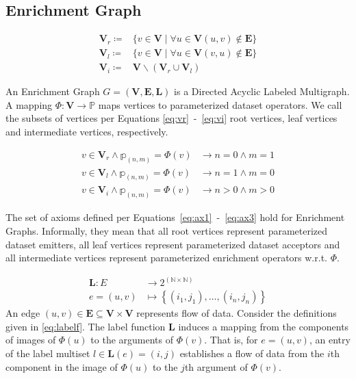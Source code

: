 \subsection{Enrichment Graph}
\label{ssec:enrichmentgraph}

\begin{align}
  \mathbf{V}_r \coloneq & \{v \in \mathbf{V} \mid \forall u \in \mathbf{V} (u, v) \notin \mathbf{E}\} \label{eq:vr} \\
  \mathbf{V}_l \coloneq & \{v \in \mathbf{V} \mid \forall u \in \mathbf{V} (v, u) \notin \mathbf{E}\} \label{eq:vl} \\
  \mathbf{V}_i \coloneq & \mathbf{V}
  \backslash (\mathbf{V}_r \cup \mathbf{V}_l) \label{eq:vi}
\end{align}

An Enrichment Graph $G=(\mathbf{V},\mathbf{E},\mathbf{L})$ is a Directed Acyclic Labeled Multigraph.
A mapping $\Phi\colon \mathbf{V} \to \mathbb{P}$ maps vertices to parameterized dataset operators.
We call the subsets of vertices per Equations \ref{eq:vr}~-~\ref{eq:vi} root vertices, leaf vertices and intermediate vertices, respectively.

\begin{align}
v \in \mathbf{V}_r \land \mathbb{p}_{(n,m)} = \Phi(v) & \to n = 0 \land m = 1 \label{eq:ax1} \\
v \in \mathbf{V}_l \land \mathbb{p}_{(n,m)} = \Phi(v) & \to n = 1 \land m = 0 \label{eq:ax2} \\
v \in \mathbf{V}_i \land \mathbb{p}_{(n,m)} = \Phi(v) & \to n > 0 \land m > 0 \label{eq:ax3}
\end{align}

The set of axioms defined per Equations~\ref{eq:ax1}~-~\ref{eq:ax3} hold for Enrichment Graphs.
Informally, they mean that all root vertices represent parameterized dataset emitters, all leaf vertices represent parameterized dataset acceptors and all intermediate vertices represent parameterized enrichment operators w.r.t. $\Phi$.

\begin{equation}
\begin{aligned}
  \mathbf{L}\colon E & \to 2^{(\mathbb{N} \times \mathbb{N})} \\
  e = (u,v) & \mapsto \left\{ (i_1, j_1), \dots, (i_n, j_n) \right\}
\end{aligned}
\label{eq:labelf}
\end{equation}
An edge $(u, v) \in \mathbf{E} \subseteq \mathbf{V} \times \mathbf{V} $ represents flow of data. Consider the definitions given in \autoref{eq:labelf}. The label function $\mathbf{L}$ induces a mapping from the components of images of $\Phi(u)$ to the arguments of $\Phi(v)$. That is, for $e=(u,v)$, an entry of the label multiset $l\in \mathbf{L}(e) = (i, j)$ establishes a flow of data from the $i$th component in the image of $\Phi(u)$ to the $j$th argument of $\Phi(v)$.

